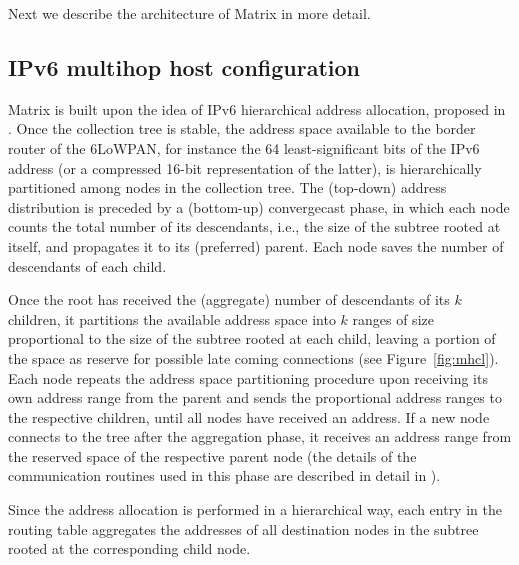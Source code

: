 Next we describe the architecture of Matrix in more detail.

\subsection{IPv6 multihop host configuration}

Matrix is built upon the idea of IPv6 hierarchical address
allocation, proposed in \cite{mhcl, 2016techreport}. Once the collection tree is
stable, the address space available to the border router of the
6LoWPAN, for instance the 64 least-significant bits of the IPv6
address (or a compressed 16-bit representation of the latter), is
hierarchically partitioned among nodes in the collection tree. The
(top-down) address distribution is preceded by a (bottom-up)
convergecast phase, in which each node counts the total number of
its descendants, i.e., the size of the subtree rooted at itself, and
propagates it to its (preferred) parent. Each node saves the number
of descendants of each child. 

Once the root has received the
(aggregate) number of descendants of its $k$ children, it partitions
the available address space into $k$ ranges of size proportional to
the size of the subtree rooted at each child, leaving a portion of
the space as reserve for possible late coming connections (see
Figure~\ref{fig:mhcl}). Each node repeats the address space
partitioning procedure upon receiving its own address range from the
parent and sends the proportional address ranges to the respective
children, until all nodes have received an address. If a new node
connects to the tree after the aggregation phase, it receives an
address range from the reserved space of the respective parent node
(the details of the communication routines used in this phase are
described in detail in \cite{2016techreport}).

Since the address allocation is performed in a hierarchical way, each entry in
the routing table aggregates the addresses of all destination nodes
in the subtree rooted at the corresponding child node. 

